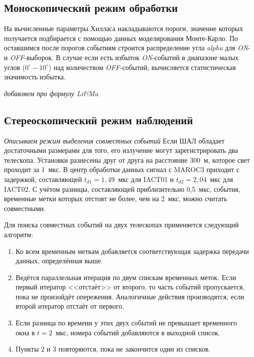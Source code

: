 \documentclass[magd,floatypics,numeref]{msudipl} %
\begin{document}
\subsection{Моноскопический режим обработки}
На вычисленные параметры Хилласа накладываются пороги, значение которых получается подбирается с помощью данных моделирования Монте-Карло. По оставшимся после порогов событиям строится распределение угла \textit{alpha} для \textit{ON}- и \textit{OFF}-выборок. В случае если есть избыток \textit{ON}-событий в диапазоне малых углов ($0^{\circ}-10^{\circ}$) над количеством \textit{OFF}-событий, вычисляется статистическая значимость избытка. 

\textit{добавляем про формулу Li\&Ma}

\subsection{Стереоскопический режим наблюдений}
\textit{Описываем режим выделения совместных событий}
Если ШАЛ обладает достаточными размерами для того, его излучение могут зарегистрировать два телескопа. Установки разнесены друг от друга на расстояние 300~м, которое свет проходит за 1~мкс. В центр обработки данных сигнал с MAROC3 приходит с задержкой, составляющей $t_{d1}=1{,}49$~мкс для IACT01 и $t_{d2} = 2{,}04$~мкс для IACT02. С учётом разницы, составляющей приблизительно 0{,}5~мкс, события, временные метки которых отстоят не более, чем на 2~мкс, можно считать совместными. 

Для поиска совместных событий на двух телескопах применяется следующий алгоритм: 
\begin{enumerate}
\item Ко всем временным меткам добавляется соответствующая задержка передачи данных, определённая выше.
\item Ведётся параллельная итерация по двум спискам временных меток. Если первый итератор <<отстаёт>> от второго, то часть событий пропускается, пока не произойдёт опережения. Аналогичные действия производятся, если второй итератор отстаёт от первого.
\item Если разница по времени у этих двух событий не превышает временного окна в $t=2$~мкс, номера событий добавляются в выходной список.
\item Пункты 2 и 3 повторяются, пока не закончится один из списков. 
\end{enumerate}
\end{document}
